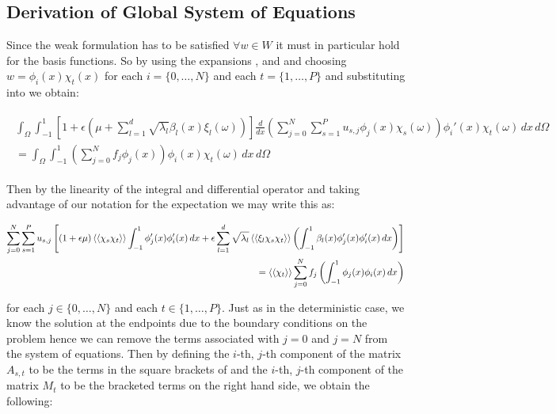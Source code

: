 \subsection{Derivation of Global System of Equations}

Since the weak formulation  has to be satisfied
$\forall w \in W$ it must in particular hold for the basis functions. So by
using the expansions ,
 and  and
choosing $w = \phi_i(x)\chi_t(x)$ for each $i = \{0,\ldots,N\}$ and each $t =
\{1,\ldots,P\}$ and substituting into  we
obtain:

\begin{align}
  \begin{split}
    \int_{\Omega}\int_{-1}^1
    \left[1 + \epsilon\left(\mu +
        \sum_{l=1}^d\sqrt{\lambda_l}\beta_l(x)\xi_l(\omega)\right)\right]
      \frac{d}{dx}\left(\sum_{j=0}^N\sum_{s=1}^Pu_{s,j}\phi_j(x)\chi_s(\omega)\right)
      \phi_i'(x)\chi_t(\omega)\, dx\, d\Omega \\ =
    \int_{\Omega}\int_{-1}^1
      \left(\sum_{j=0}^Nf_j\phi_j(x)\right)
      \phi_i(x)\chi_t(\omega)\, dx\, d\Omega
  \end{split}
\end{align}

Then by the linearity of the integral and differential operator and taking
advantage of our notation for the expectation
 we may write this as:

\begin{align}\label{eq:oned-stochastic-discrete}
  \begin{split}
      \sum_{j=0}^N\sum_{s=1}^Pu_{s,j}\left[
          (1 + \epsilon\mu)\left\langle\langle\chi_s\chi_t\right\rangle\rangle
          \int_{-1}^1\phi_j'(x)\phi_i'(x)\, dx +
          \epsilon\sum_{l=1}^d\sqrt{\lambda_l}\left\langle\langle\xi_l\chi_s\chi_t\right\rangle\rangle
          \left(\int_{-1}^1 \beta_l(x)\phi_j'(x)\phi_i'(x)\, dx\right)
      \right]\\ =
      \left\langle\langle\chi_t\right\rangle\rangle\sum_{j=0}^Nf_j
          \left(\int_{-1}^1\phi_j(x)\phi_i(x)\, dx\right)
  \end{split}
\end{align}

for each $j \in \{0,\ldots,N\}$ and each $t \in \{1,\ldots,P\}$. Just as in the
deterministic case, we know the solution at the endpoints due to the boundary
conditions on the problem  hence we can remove the
terms associated with $j = 0$ and $j = N$ from the system of equations. Then by
defining the $i$-th, $j$-th component of the matrix $A_{s,t}$ to be the terms
in the square brackets of  and the $i$-th,
$j$-th component of the matrix $M_{t}$ to be the bracketed terms on the right
hand side, we obtain the following:

